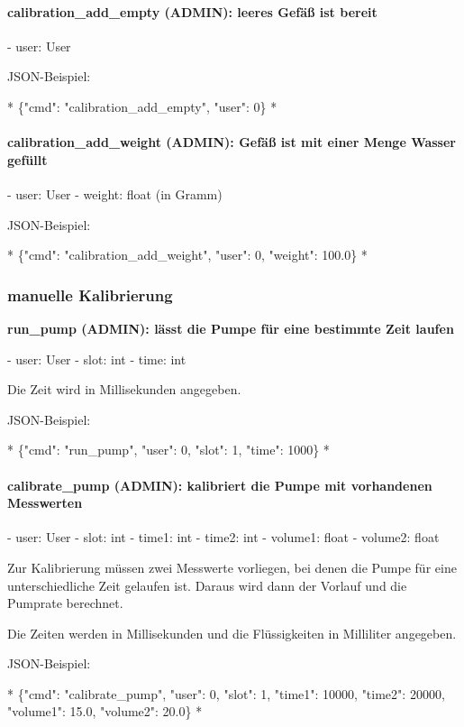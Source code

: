 \paragraph{ calibration\_add\_empty (ADMIN): leeres Gefäß ist bereit}

- user: User

JSON-Beispiel:

*
\{"cmd": "calibration\_add\_empty", "user": 0\}
*

\paragraph{ calibration\_add\_weight (ADMIN): Gefäß ist mit einer Menge Wasser gefüllt}

- user: User
- weight: float (in Gramm)

JSON-Beispiel:

*
\{"cmd": "calibration\_add\_weight", "user": 0, "weight": 100.0\}
*

\subsubsection{manuelle Kalibrierung}

\textbf{ run\_pump (ADMIN): lässt die Pumpe für eine bestimmte Zeit laufen}

- user: User
- slot: int
- time: int

Die Zeit wird in Millisekunden angegeben.

JSON-Beispiel:

*
\{"cmd": "run\_pump", "user": 0, "slot": 1, "time": 1000\}
*

\paragraph{calibrate\_pump (ADMIN): kalibriert die Pumpe mit vorhandenen Messwerten}

- user: User
- slot: int
- time1: int
- time2: int
- volume1: float
- volume2: float

Zur Kalibrierung müssen zwei Messwerte vorliegen, bei denen die Pumpe für eine unterschiedliche Zeit gelaufen ist. Daraus wird dann der Vorlauf und die Pumprate berechnet.

Die Zeiten werden in Millisekunden und die Flüssigkeiten in Milliliter angegeben.

JSON-Beispiel:

*
\{"cmd": "calibrate\_pump", "user": 0, "slot": 1, "time1": 10000, "time2": 20000, "volume1": 15.0, "volume2": 20.0\}
*

